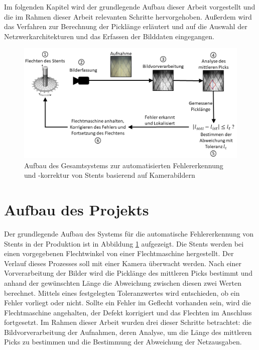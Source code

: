 Im folgenden Kapitel wird der grundlegende Aufbau dieser Arbeit vorgestellt und die im Rahmen dieser Arbeit relevanten Schritte hervorgehoben. Außerdem wird das Verfahren zur Berechnung der Picklänge erläutert und auf die Auswahl der Netzwerkarchitekturen und das Erfassen der Bilddaten eingegangen.

\begin{figure}[h!]
\centering
\includegraphics[width=15cm]{98_images/aufbau_projekt.png}
\caption{Aufbau des Gesamtsystems zur automatisierten Fehlererkennung und -korrektur von Stents basierend auf Kamerabildern}
\label{fig:aufbau_des_projekts}
\end{figure}


\section{Aufbau des Projekts}\label{sec:?}
Der grundlegende Aufbau des Systems für die automatische Fehlererkennung von Stents in der Produktion ist in Abbildung \ref{fig:aufbau_des_projekts} aufgezeigt. Die Stents werden bei einen vorgegebenen Flechtwinkel von einer Flechtmaschine hergestellt. Der Verlauf dieses Prozesses soll mit einer Kamera überwacht werden. Nach einer Vorverarbeitung der Bilder wird die Picklänge des mittleren Picks bestimmt und anhand der gewünschten Länge die Abweichung zwischen diesen zwei Werten berechnet. Mittels eines festgelegten Toleranzwertes wird entschieden, ob ein Fehler vorliegt oder nicht. Sollte ein Fehler im Geflecht vorhanden sein, wird die Flechtmaschine angehalten, der Defekt korrigiert und das Flechten im Anschluss fortgesetzt. Im Rahmen dieser Arbeit wurden drei dieser Schritte betrachtet: die Bildvorverarbeitung der Aufnahmen, deren Analyse, um die Länge des mittleren Picks zu bestimmen und die Bestimmung der Abweichung der Netzausgaben.


